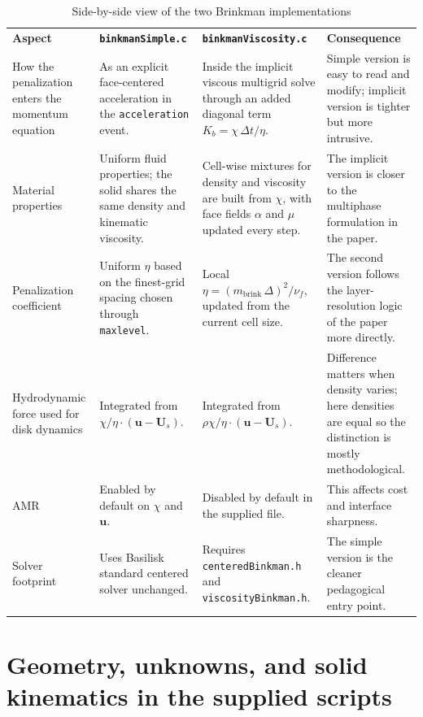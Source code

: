 \documentclass[11pt,a4paper]{article}
\begin{document}
\begin{table}[h!]
\centering
\small
\caption{Side-by-side view of the two Brinkman implementations}
\begin{tabularx}{\textwidth}{>{\raggedright\arraybackslash}p{}Y Y >{\raggedright\arraybackslash}p{0.18\textwidth}}
\textbf{Aspect} & \textbf{\texttt{binkmanSimple.c}} & \textbf{\texttt{binkmanViscosity.c}} & \textbf{Consequence} \\
How the penalization enters the momentum equation & As an explicit face-centered acceleration in the \texttt{acceleration} event. & Inside the implicit viscous multigrid solve through an added diagonal term $K_b = \chi\,\Delta t/\eta$. & Simple version is easy to read and modify; implicit version is tighter but more intrusive. \\
Material properties & Uniform fluid properties; the solid shares the same density and kinematic viscosity. & Cell-wise mixtures for density and viscosity are built from $\chi$, with face fields $\alpha$ and $\mu$ updated every step. & The implicit version is closer to the multiphase formulation in the paper. \\
Penalization coefficient & Uniform $\eta$ based on the finest-grid spacing chosen through \texttt{maxlevel}. & Local $\eta = (m_{\mathrm{brink}}\,\Delta)^2/\nu_f$, updated from the current cell size. & The second version follows the layer-resolution logic of the paper more directly. \\
Hydrodynamic force used for disk dynamics & Integrated from $\chi/\eta\cdot(\bm{u}-\bm{U}_s)$. & Integrated from $\rho\chi/\eta\cdot(\bm{u}-\bm{U}_s)$. & Difference matters when density varies; here densities are equal so the distinction is mostly methodological. \\
AMR & Enabled by default on $\chi$ and $\bm{u}$. & Disabled by default in the supplied file. & This affects cost and interface sharpness. \\
Solver footprint & Uses Basilisk standard centered solver unchanged. & Requires \texttt{centeredBinkman.h} and \texttt{viscosityBinkman.h}. & The simple version is the cleaner pedagogical entry point. \\
\end{tabularx}
\end{table}

\section{Geometry, unknowns, and solid kinematics in the supplied scripts}
\end{document}
